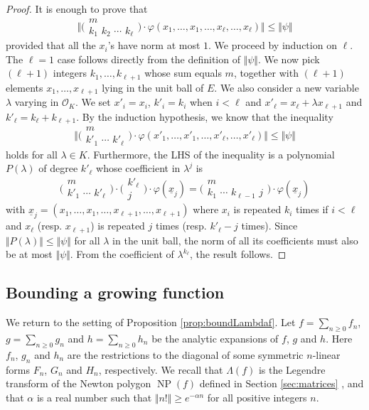 \documentclass{sig-alternate}
\DeclareMathOperator{\NP}{NP}
\renewcommand{\O}{\mathcal O}
\def\binom#1#2{\Big(\begin{array}{cc} #1 \\ #2 \end{array}\Big)}
\begin{document}
\begin{proof}
It is enough to prove that
$$\Big\Vert \binom m {k_1 \,\, k_2 \,\, \cdots \,\, k_\ell} \cdot
\varphi(x_1, \ldots, x_1, \ldots, x_\ell, \ldots,
x_\ell) \Big\Vert \leq \Vert \psi \Vert$$
provided that all the $x_i$'s have norm at most $1$. We proceed by 
induction on 
$\ell$. The $\ell = 1$ case follows directly from
the definition of $\Vert \psi \Vert$. 
We now pick $(\ell+1)$ integers $k_1, \ldots, k_{\ell+1}$ whose sum 
equals $m$, together with $(\ell+1)$ elements $x_1, \ldots, x_{\ell+1}$
lying in the unit ball of $E$.
We also consider a new variable $\lambda$ varying in
$\O_K$. We set $x'_i = x_i$, $k'_i = k_i$ when $i < \ell$ and $x'_\ell 
= x_\ell + \lambda x_{\ell+1}$ and $k'_\ell = k_\ell + k_{\ell+1}$. By the 
induction hypothesis, we know that the inequality
$$\Big\Vert \binom m {k'_1 \,\, \cdots \,\, k'_\ell} \cdot
\varphi(x'_1, \ldots, x'_1, \ldots, x'_\ell, \ldots, x'_\ell) \Big\Vert
\leq \Vert \psi \Vert$$
holds for all $\lambda \in K$. Furthermore, the LHS of the inequality
is a polynomial $P(\lambda)$ of degree $k'_\ell$ whose coefficient in 
$\lambda^j$ is
$$\binom m {k'_1 \,\, \cdots \,\, k'_\ell} \cdot
\binom {k'_\ell} {j} \cdot
\varphi(\underline x_j) = 
\binom m {k_1 \,\, \cdots \,\, k_{\ell-1} \,\, j} \cdot
\varphi(\underline x_j)$$
with
$\underline x_j = (x_1, \ldots, x_1, \ldots, x_{\ell+1}, \ldots, 
x_{\ell+1})$
where $x_i$ is repeated $k_i$ times if $i < \ell$ and $x_\ell$ 
(resp. $x_{\ell+1}$) is repeated $j$ times (resp. $k'_\ell - j$ times).
Since $\Vert P(\lambda) \Vert \leq \Vert \psi \Vert$ for all $\lambda$ in 
the unit ball, the norm of all its coefficients must also be at most $\Vert \psi
\Vert$. From the coefficient of $\lambda^{k_\ell}$, the result follows.
\end{proof}

\subsection{Bounding a growing function}

We return to the setting of Proposition \ref{prop:boundLambdaf}.
Let $f = \sum_{n \geq 0} f_n$, $g = \sum_{n \geq 0} g_n$ and
$h = \sum_{n \geq 0} h_n$ be the analytic expansions of
$f$, $g$ and $h$.
Here $f_n$, $g_n$ and $h_n$ are the restrictions to the diagonal of 
some symmetric $n$-linear forms $F_n$, $G_n$ and $H_n$, respectively.
We recall that $\Lambda(f)$ 
is the Legendre transform of the Newton polygon $\NP(f)$ defined in Section \ref{sec:matrices}
\cite[Proposition 3.9]{caruso-roe-vaccon:14a}, and that $\alpha$ is a
real number such that $\Vert n! \Vert \geq e^{-\alpha n}$ for all positive integers $n$.
\end{document}
